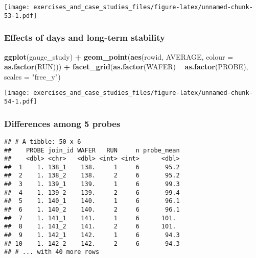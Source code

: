 \documentclass[]{book}
\newenvironment{Shaded}{\begin{snugshade}}{\end{snugshade}}
\newcommand{\DataTypeTok}[1]{\textcolor[rgb]{0.13,0.29,0.53}{#1}}
\newcommand{\KeywordTok}[1]{\textcolor[rgb]{0.13,0.29,0.53}{\textbf{#1}}}
\newcommand{\NormalTok}[1]{#1}
\newcommand{\OperatorTok}[1]{\textcolor[rgb]{0.81,0.36,0.00}{\textbf{#1}}}
\newcommand{\OtherTok}[1]{\textcolor[rgb]{0.56,0.35,0.01}{#1}}
\newcommand{\StringTok}[1]{\textcolor[rgb]{0.31,0.60,0.02}{#1}}
\theoremstyle{definition}
\theoremstyle{definition}
\theoremstyle{definition}
\theoremstyle{remark}
\begin{document}
\texttt{[image: exercises\_and\_case\_studies\_files/figure-latex/unnamed-chunk-53-1.pdf]}

\hypertarget{effects-of-days-and-long-term-stability}{%
\subsubsection{Effects of days and long-term
stability}\label{effects-of-days-and-long-term-stability}}

\begin{Shaded}
\begin{Highlighting}[]
\KeywordTok{ggplot}\NormalTok{(gauge_study) }\OperatorTok{+}
\StringTok{  }\KeywordTok{geom_point}\NormalTok{(}\KeywordTok{aes}\NormalTok{(rowid, AVERAGE, }\DataTypeTok{colour =} \KeywordTok{as.factor}\NormalTok{(RUN))) }\OperatorTok{+}
\StringTok{  }\KeywordTok{facet_grid}\NormalTok{(}\KeywordTok{as.factor}\NormalTok{(WAFER) }\OperatorTok{~}\StringTok{ }\KeywordTok{as.factor}\NormalTok{(PROBE), }\DataTypeTok{scales =} \StringTok{"free_y"}\NormalTok{)}
\end{Highlighting}
\end{Shaded}

\texttt{[image: exercises\_and\_case\_studies\_files/figure-latex/unnamed-chunk-54-1.pdf]}

\hypertarget{differences-among-5-probes}{%
\subsubsection{Differences among 5
probes}\label{differences-among-5-probes}}

\begin{Shaded}
\end{Shaded}

\begin{verbatim}
## # A tibble: 50 x 6
##    PROBE join_id WAFER   RUN     n probe_mean
##    <dbl> <chr>   <dbl> <int> <int>      <dbl>
##  1    1. 138_1    138.     1     6       95.2
##  2    1. 138_2    138.     2     6       95.2
##  3    1. 139_1    139.     1     6       99.3
##  4    1. 139_2    139.     2     6       99.4
##  5    1. 140_1    140.     1     6       96.1
##  6    1. 140_2    140.     2     6       96.1
##  7    1. 141_1    141.     1     6      101. 
##  8    1. 141_2    141.     2     6      101. 
##  9    1. 142_1    142.     1     6       94.3
## 10    1. 142_2    142.     2     6       94.3
## # ... with 40 more rows
\end{verbatim}
\end{document}
